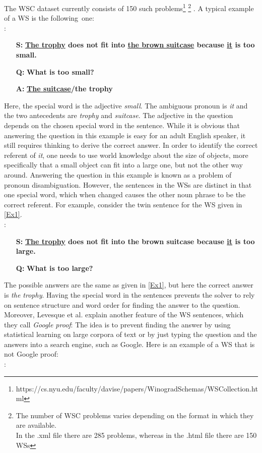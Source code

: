 The WSC dataset currently consists of 150 such problems\footnote{https://cs.nyu.edu/faculty/davise/papers/WinogradSchemas/WSCollection.html} \footnote{The number of WSC problems varies depending on the format in which they are available.\\In the .xml file there are 285 problems, whereas in the .html file there are 150 WSs} .
A typical example of a WS is the following~one:\\
:
\begin{itemize} 
	\item[\textbf{S:}] \textbf{\underline{The trophy} does not fit into \underline{the brown suitcase} because \underline{it} is too small.}
	\item[\textbf{Q:}] \textbf{What is too small?}
	\item[\textbf{A:}] \textbf{\underline{The suitcase}/the trophy}
\end{itemize}

Here, the special word is the adjective \textit{small}. The ambiguous pronoun is \textit{it} and the two antecedents are \textit{trophy} and \textit{suitcase}. The adjective in the question depends on the chosen special word in the sentence. While it is obvious that answering the question in this example is easy for an adult English speaker, it still requires thinking to derive the correct answer. In order to identify the correct referent of \textit{it}, one needs to use world knowledge about the size of objects, more specifically that a small object can fit into a large one, but not the other way around. Answering the question in this example is known as a problem of pronoun disambiguation. However, the sentences in the WSs are distinct in that one special word, which when changed causes the other noun phrase to be the correct referent. For example, consider the twin sentence for the WS given in \ref{Ex1}.\\
:
\begin{itemize} 
	\item[\textbf{S:}] \textbf{\underline{The trophy} does not fit into the brown suitcase because \underline{it} is too large.}
	\item[\textbf{Q:}] \textbf{What is too large?}
\end{itemize}

The possible answers are the same as given in \ref{Ex1}, but here the correct answer is \textit{the trophy}. Having the special word in the sentences prevents the solver to rely on sentence structure and word order for finding the answer to the question. 
Moreover, Levesque et al. \cite{DBLP:conf/kr/LevesqueDM12} explain another feature of the WS sentences, which they call \textit{Google proof}: The idea is to prevent finding the answer by using statistical learning on large corpora of text or by just typing the question and the answers into a search engine, such as Google. 
Here is an example of a WS that is not Google proof:\\
:

